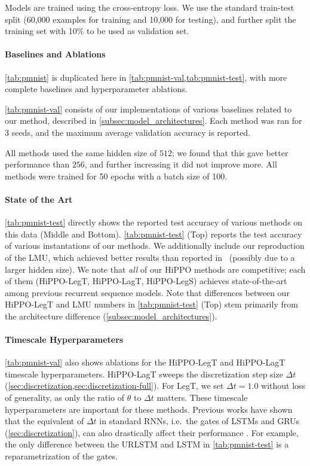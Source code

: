 \documentclass[../hippo.tex]{subfiles}
\begin{document}
Models are trained using the cross-entropy loss.
We use the standard train-test split (60,000 examples for training and 10,000
for testing), and further split the training set with
10\% to be used as validation set.

\paragraph{Baselines and Ablations}

\cref{tab:pmnist} is duplicated here in \cref{tab:pmnist-val,tab:pmnist-test}, with more complete baselines and hyperparameter ablations.

\cref{tab:pmnist-val} consists of our implementations of various baselines related to our method, described in \cref{subsec:model_architectures}.
Each method was ran for 3 seeds, and the maximum average validation accuracy is reported.

All methods used the same hidden size of $512$; we found that this gave better performance than $256$, and further increasing it did not improve more.
All methods were trained for 50 epochs with a batch size of 100.

\paragraph{State of the Art}
\cref{tab:pmnist-test} directly shows the reported test accuracy of various methods on this data (Middle and Bottom).
\cref{tab:pmnist-test} (Top) reports the test accuracy of various instantations of our methods.
We additionally include our reproduction of the LMU,
which achieved better results than reported in~\citet{voelker2019legendre} (possibly due to a larger hidden size).
We note that \emph{all} of our HiPPO methods are competitive; each of them (HiPPO-LegT, HiPPO-LagT, HiPPO-LegS) achieves state-of-the-art among previous recurrent sequence models.
Note that differences between our HiPPO-LegT and LMU numbers in \cref{tab:pmnist-test} (Top) stem primarily from the architecture difference (\cref{subsec:model_architectures}).

\paragraph{Timescale Hyperparameters}
\cref{tab:pmnist-val} also shows ablations for the HiPPO-LegT and HiPPO-LagT timescale hyperparameters.
HiPPO-LagT sweeps the discretization step size $\Delta t$ (\cref{sec:discretization,sec:discretization-full}).
For LegT, we set $\Delta t = 1.0$ without loss of generality, as only the ratio of $\theta$ to $\Delta t$ matters.
These timescale hyperparameters are important for these methods.
Previous works have shown that the equivalent of $\Delta t$ in standard RNNs, i.e.\ the gates of LSTMs and GRUs (\cref{sec:discretization}), can also drastically affect their performance \cite{tallec2018can,gu2020improving}.
For example, the only difference between the URLSTM and LSTM in \cref{tab:pmnist-test} is a reparametrization of the gates.
\end{document}
